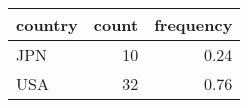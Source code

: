 \begin{table}[!h]
\centering
\begin{tabular}[t]{lrr}
\toprule
country & count & frequency\\
\midrule
JPN & 10 & 0.24\\
USA & 32 & 0.76\\
\bottomrule
\end{tabular}
\end{table}
